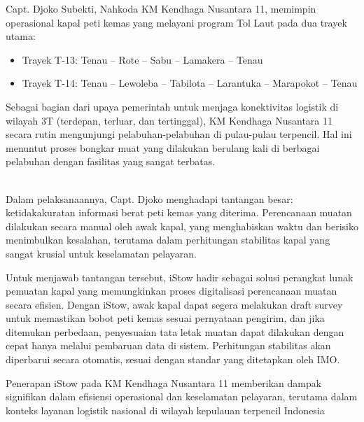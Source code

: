 Capt. Djoko Subekti, Nahkoda KM Kendhaga Nusantara 11, memimpin operasional kapal peti kemas yang melayani program Tol Laut pada dua trayek utama:
\begin{itemize}
    \item Trayek T-13: Tenau – Rote – Sabu – Lamakera – Tenau
    \item Trayek T-14: Tenau – Lewoleba – Tabilota – Larantuka – Marapokot – Tenau
\end{itemize}

Sebagai bagian dari upaya pemerintah untuk menjaga konektivitas logistik di wilayah 3T (terdepan, terluar, dan tertinggal), KM Kendhaga Nusantara 11 secara rutin mengunjungi pelabuhan-pelabuhan di pulau-pulau terpencil. Hal ini menuntut proses bongkar muat yang dilakukan berulang kali di berbagai pelabuhan dengan fasilitas yang sangat terbatas.\\

{
\\
}

Dalam pelaksanaannya, Capt. Djoko menghadapi tantangan besar: ketidakakuratan informasi berat peti kemas yang diterima. Perencanaan muatan dilakukan secara manual oleh awak kapal, yang menghabiskan waktu dan berisiko menimbulkan kesalahan, terutama dalam perhitungan stabilitas kapal yang sangat krusial untuk keselamatan pelayaran.

Untuk menjawab tantangan tersebut, iStow hadir sebagai solusi perangkat lunak pemuatan kapal yang memungkinkan proses digitalisasi perencanaan muatan secara efisien. Dengan iStow, awak kapal dapat segera melakukan draft survey untuk memastikan bobot peti kemas sesuai pernyataan pengirim, dan jika ditemukan perbedaan, penyesuaian tata letak muatan dapat dilakukan dengan cepat hanya melalui pembaruan data di sistem. Perhitungan stabilitas akan diperbarui secara otomatis, sesuai dengan standar yang ditetapkan oleh IMO.

Penerapan iStow pada KM Kendhaga Nusantara 11 memberikan dampak signifikan dalam efisiensi operasional dan keselamatan pelayaran, terutama dalam konteks layanan logistik nasional di wilayah kepulauan terpencil Indonesia

